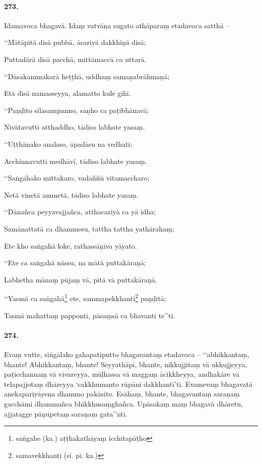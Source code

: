 \paragraph{273.} Idamavoca bhagavā. Idaṃ vatvāna sugato athāparaṃ etadavoca satthā –

‘‘Mātāpitā disā pubbā, ācariyā dakkhiṇā disā;

Puttadārā disā pacchā, mittāmaccā ca uttarā.

‘‘Dāsakammakarā heṭṭhā, uddhaṃ samaṇabrāhmaṇā;

Etā disā namasseyya, alamatto kule gihī.

‘‘Paṇḍito sīlasampanno, saṇho ca paṭibhānavā;

Nivātavutti atthaddho, tādiso labhate yasaṃ.

‘‘Uṭṭhānako analaso, āpadāsu na vedhati;

Acchinnavutti medhāvī, tādiso labhate yasaṃ.

‘‘Saṅgāhako mittakaro, vadaññū vītamaccharo;

Netā vinetā anunetā, tādiso labhate yasaṃ.

‘‘Dānañca peyyavajjañca, atthacariyā ca yā idha;

Samānattatā ca dhammesu, tattha tattha yathārahaṃ;

Ete kho saṅgahā loke, rathassāṇīva yāyato.

‘‘Ete ca saṅgahā nāssu, na mātā puttakāraṇā;

Labhetha mānaṃ pūjaṃ vā, pitā vā puttakāraṇā.

‘‘Yasmā ca saṅgahā\footnote{saṅgahe (ka.) aṭṭhakathāyaṃ icchitapāṭho} ete, sammapekkhanti\footnote{samavekkhanti (sī. pī. ka.)} paṇḍitā;

Tasmā mahattaṃ papponti, pāsaṃsā ca bhavanti te’’ti.

\paragraph{274.} Evaṃ vutte, siṅgālako gahapatiputto bhagavantaṃ etadavoca – ‘‘abhikkantaṃ, bhante! Abhikkantaṃ, bhante! Seyyathāpi, bhante, nikkujjitaṃ vā ukkujjeyya, paṭicchannaṃ vā vivareyya, mūḷhassa vā maggaṃ ācikkheyya, andhakāre vā telapajjotaṃ dhāreyya ‘cakkhumanto rūpāni dakkhantī’ti. Evamevaṃ bhagavatā anekapariyāyena dhammo pakāsito. Esāhaṃ, bhante, bhagavantaṃ saraṇaṃ gacchāmi dhammañca bhikkhusaṃghañca. Upāsakaṃ maṃ bhagavā dhāretu, ajjatagge pāṇupetaṃ saraṇaṃ gata’’nti.

